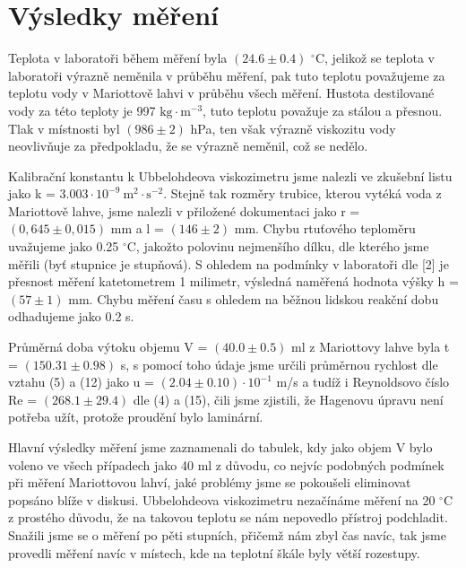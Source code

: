 \documentclass{article}
\begin{document}
\section*{Výsledky měření}
\par Teplota v laboratoři během měření byla $(24.6\pm0.4)$ $^{\circ}$C, jelikož se teplota v laboratoři výrazně neměnila v průběhu měření, pak tuto teplotu považujeme za teplotu vody v Mariottově lahvi v průběhu všech měření. Hustota destilované vody za této teploty je 997 $\mathrm{kg \cdot m^{-3}}$, tuto teplotu považuje za stálou a přesnou. Tlak v místnosti byl $(986\pm2)$ hPa, ten však výrazně viskozitu vody neovlivňuje za předpokladu, že se výrazně neměnil, což se nedělo.
\par Kalibrační konstantu k Ubbelohdeova viskozimetru jsme nalezli ve zkušební listu jako k = $3.003\cdot 10^{-9}\: \mathrm{m^{2}\cdot s^{-2}}$. Stejně tak rozměry trubice, kterou vytéká voda z Mariottově lahve, jsme nalezli v přiložené dokumentaci jako r = $(0,645\pm0,015)$ mm a l = $(146\pm2)$ mm. Chybu rtuťového teploměru uvažujeme jako 0.25 $^{\circ}$C, jakožto polovinu nejmenšího dílku, dle kterého jsme měřili (byť stupnice je stupňová).
S ohledem na podmínky v laboratoři dle [2] je přesnost měření katetometrem 1 milimetr, výsledná naměřená hodnota výšky h = $(57\pm1)$ mm. Chybu měření času s ohledem na běžnou lidskou reakční dobu odhadujeme jako 0.2 s. 
\par Průměrná doba výtoku objemu V = $(40.0\pm0.5)$ ml z Mariottovy lahve byla t = $(150.31\pm0.98)$ s, s pomocí toho údaje jsme určili průměrnou rychlost dle vztahu (5) a (12) jako u = $(2.04\pm0.10)\cdot 10^{-1}$ m/s a tudíž i Reynoldsovo číslo Re = $(268.1\pm29.4)$ dle (4) a (15), čili jsme zjistili, že Hagenovu úpravu není potřeba užít, protože proudění bylo laminární.
\par Hlavní výsledky měření jsme zaznamenali do tabulek, kdy jako objem V bylo voleno ve všech případech jako 40 ml z důvodu, co nejvíc podobných podmínek při měření Mariottovou lahví, jaké problémy jsme se pokoušeli eliminovat popsáno blíže v diskusi.
Ubbelohdeova viskozimetru nezačínáme měření na 20 $^{\circ}$C z prostého důvodu, že na takovou teplotu se nám nepovedlo přístroj podchladit. Snažili jsme se o měření po pěti stupních, přičemž nám zbyl čas navíc, tak jsme provedli měření navíc v místech, kde na teplotní škále byly větší rozestupy.
\end{document}
